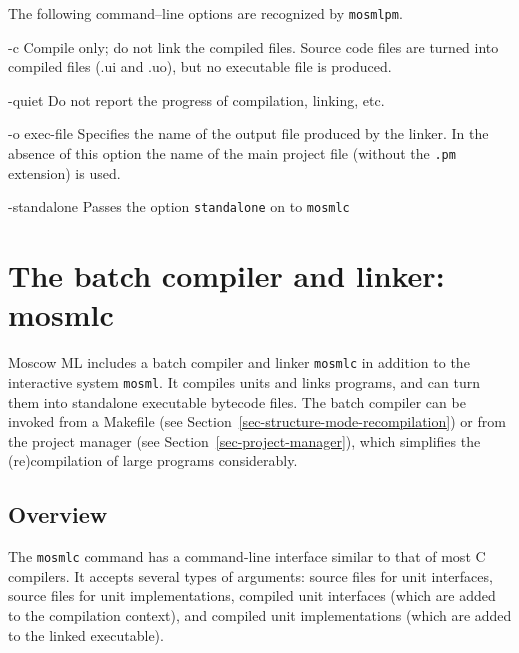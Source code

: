 \documentclass[fleqn,a4paper]{article}
\begin{document}
The following command--line options are recognized by
\texttt{mosmlpm}.

\begin{commandlineoptions} 
\item[-c] Compile only; do not link the compiled files.  Source code
  files are turned into compiled files (.ui and .uo), but no
  executable file is produced.
  
\item[-quiet] Do not report the progress of compilation, linking, etc.
  
\item[-o \textrm{exec-file}] Specifies the name of the output file
  produced by the linker.  In the absence of this option the name of
  the main project file (without the \texttt{.pm} extension) is used.

  
\item[-standalone] Passes the option \texttt{standalone} on to
  \texttt{mosmlc}
\end{commandlineoptions}

\newpage

\section{The batch compiler and linker: mosmlc}
\label{sec-batch-compiler}

Moscow ML includes a batch compiler and linker {\tt mosmlc} in
addition to the interactive system {\tt mosml}.  It compiles units and
links programs, and can turn them into standalone executable bytecode
files.  The batch compiler can be invoked from a Makefile (see
Section~\ref{sec-structure-mode-recompilation}) or from the project
manager (see Section~\ref{sec-project-manager}), which simplifies the
(re)compilation of large programs considerably.


\subsection{Overview}

The {\tt mosmlc} command has a command-line interface similar to that
of most C compilers.  It accepts several types of arguments: source
files for unit interfaces, source files for unit implementations,
compiled unit interfaces (which are added to the compilation context),
and compiled unit implementations (which are added to the linked
executable).
\end{document}
